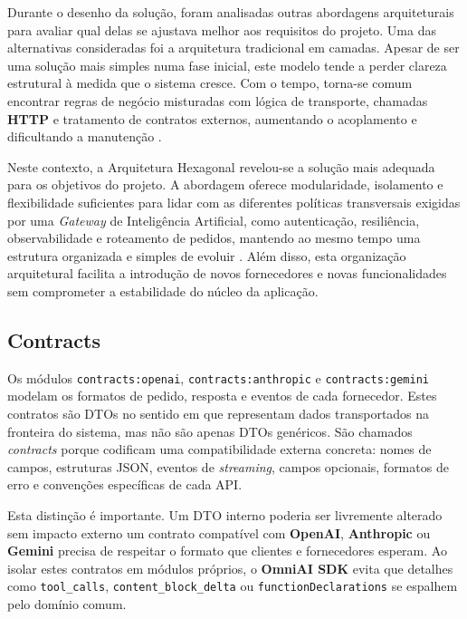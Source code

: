 Durante o desenho da solução, foram analisadas outras abordagens arquiteturais para avaliar qual delas se ajustava melhor aos requisitos do projeto. Uma das alternativas consideradas foi a arquitetura tradicional em camadas. Apesar de ser uma solução mais simples numa fase inicial, este modelo tende a perder clareza estrutural à medida que o sistema cresce. Com o tempo, torna-se comum encontrar regras de negócio misturadas com lógica de transporte, chamadas \textbf{HTTP} e tratamento de contratos externos, aumentando o acoplamento e dificultando a manutenção \cite{graca_explicit_architecture}.

Neste contexto, a Arquitetura Hexagonal revelou-se a solução mais adequada para os objetivos do projeto. A abordagem oferece modularidade, isolamento e flexibilidade suficientes para lidar com as diferentes políticas transversais exigidas por uma \textit{Gateway} de Inteligência Artificial, como autenticação, resiliência, observabilidade e roteamento de pedidos, mantendo ao mesmo tempo uma estrutura organizada e simples de evoluir \cite{api_gateway_design, ai_gateway_pattern, karl_ai_gateway}. Além disso, esta organização arquitetural facilita a introdução de novos fornecedores e novas funcionalidades sem comprometer a estabilidade do núcleo da aplicação.

    \subsection{Contracts}
    Os módulos \texttt{contracts:openai}, \texttt{contracts:anthropic} e \texttt{contracts:gemini} modelam os formatos de pedido, resposta e eventos de cada fornecedor. Estes contratos são DTOs no sentido em que representam dados transportados na fronteira do sistema, mas não são apenas DTOs genéricos. São chamados \textit{contracts} porque codificam uma compatibilidade externa concreta: nomes de campos, estruturas JSON, eventos de \textit{streaming}, campos opcionais, formatos de erro e convenções específicas de cada API.

    Esta distinção é importante. Um DTO interno poderia ser livremente alterado sem impacto externo um contrato compatível com \textbf{OpenAI}, \textbf{Anthropic} ou \textbf{Gemini} precisa de respeitar o formato que clientes e fornecedores esperam. Ao isolar estes contratos em módulos próprios, o \textbf{OmniAI SDK} evita que detalhes como \texttt{tool\_calls}, \texttt{content\_block\_delta} ou \texttt{functionDeclarations} se espalhem pelo domínio comum.

